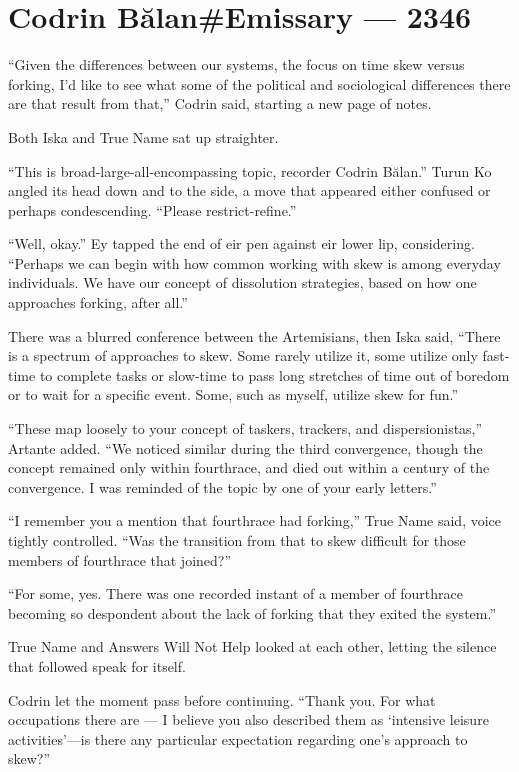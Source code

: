 \hypertarget{codrin-bux103lanemissary-2346}{%
\chapter{Codrin Bălan\#Emissary — 2346}}

\noindent ``Given the differences between our systems, the focus on time skew versus forking, I'd like to see what some of the political and sociological differences there are that result from that,'' Codrin said, starting a new page of notes.

Both Iska and True Name sat up straighter.

``This is broad-large-all-encompassing topic, recorder Codrin Bălan.'' Turun Ko angled its head down and to the side, a move that appeared either confused or perhaps condescending. ``Please restrict-refine.''

``Well, okay.'' Ey tapped the end of eir pen against eir lower lip, considering. ``Perhaps we can begin with how common working with skew is among everyday individuals. We have our concept of dissolution strategies, based on how one approaches forking, after all.''

There was a blurred conference between the Artemisians, then Iska said, ``There is a spectrum of approaches to skew. Some rarely utilize it, some utilize only fast-time to complete tasks or slow-time to pass long stretches of time out of boredom or to wait for a specific event. Some, such as myself, utilize skew for fun.''

``These map loosely to your concept of taskers, trackers, and dispersionistas,'' Artante added. ``We noticed similar during the third convergence, though the concept remained only within fourthrace, and died out within a century of the convergence. I was reminded of the topic by one of your early letters.''

``I remember you a mention that fourthrace had forking,'' True Name said, voice tightly controlled. ``Was the transition from that to skew difficult for those members of fourthrace that joined?''

``For some, yes. There was one recorded instant of a member of fourthrace becoming so despondent about the lack of forking that they exited the system.''

True Name and Answers Will Not Help looked at each other, letting the silence that followed speak for itself.

Codrin let the moment pass before continuing. ``Thank you. For what occupations there are — I believe you also described them as `intensive leisure activities'—is there any particular expectation regarding one's approach to skew?''

